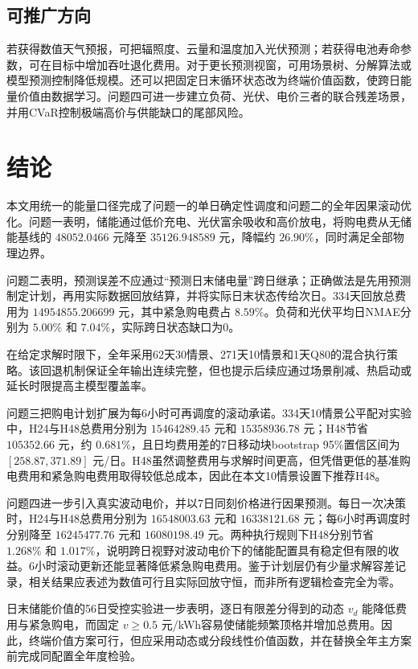 \documentclass[UTF8,12pt,a4paper]{ctexart}
\begin{document}
\subsection{可推广方向}

若获得数值天气预报，可把辐照度、云量和温度加入光伏预测；若获得电池寿命参数，可在目标中增加吞吐退化费用。对于更长预测视窗，可用场景树、分解算法或模型预测控制降低规模。还可以把固定日末循环状态改为终端价值函数，使跨日能量价值由数据学习。问题四可进一步建立负荷、光伏、电价三者的联合残差场景，并用CVaR控制极端高价与供能缺口的尾部风险。

\section{结论}

本文用统一的能量口径完成了问题一的单日确定性调度和问题二的全年因果滚动优化。问题一表明，储能通过低价充电、光伏富余吸收和高价放电，将购电费从无储能基线的 $48052.0466$ 元降至 $35126.948589$ 元，降幅约 $26.90\%$，同时满足全部物理边界。

问题二表明，预测误差不应通过“预测日末储电量”跨日继承；正确做法是先用预测制定计划，再用实际数据回放结算，并将实际日末状态传给次日。334天回放总费用为 $14954855.206699$ 元，其中紧急购电费占 $8.59\%$。负荷和光伏平均日NMAE分别为 $5.00\%$ 和 $7.04\%$，实际跨日状态缺口为0。

在给定求解时限下，全年采用62天30情景、271天10情景和1天Q80的混合执行策略。该回退机制保证全年输出连续完整，但也提示后续应通过场景削减、热启动或延长时限提高主模型覆盖率。

问题三把购电计划扩展为每6小时可再调度的滚动承诺。334天10情景公平配对实验中，H24与H48总费用分别为 $15464289.45$ 元和 $15358936.78$ 元；H48节省 $105352.66$ 元，约 $0.681\%$，且日均费用差的7日移动块bootstrap 95\%置信区间为 $[258.87,371.89]$ 元/日。H48虽然调整费用与求解时间更高，但凭借更低的基准购电费用和紧急购电费用取得较低总成本，因此在本文10情景设置下推荐H48。

问题四进一步引入真实波动电价，并以7日同刻价格进行因果预测。每日一次决策时，H24与H48总费用分别为 $16548003.63$ 元和 $16338121.68$ 元；每6小时再调度时分别降至 $16245477.76$ 元和 $16080198.49$ 元。两种执行规则下H48分别节省 $1.268\%$ 和 $1.017\%$，说明跨日视野对波动电价下的储能配置具有稳定但有限的收益。6小时滚动更新还能显著降低紧急购电费用。鉴于计划层仍有少量求解容差记录，相关结果应表述为数值可行且实际回放守恒，而非所有逻辑检查完全为零。

日末储能价值的56日受控实验进一步表明，逐日有限差分得到的动态 $v_d$ 能降低费用与紧急购电，而固定 $v\ge0.5$ 元/kWh容易使储能频繁顶格并增加总费用。因此，终端价值方案可行，但应采用动态或分段线性价值函数，并在替换全年主方案前完成同配置全年度检验。
\end{document}
